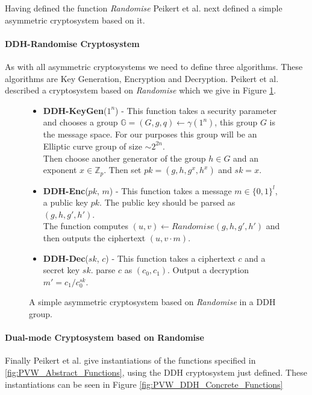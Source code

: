 \documentclass[ %
                    author={Nicholas Tutte},
                supervisor={Prof. Nigel Smart},
                    degree={MEng},
                     title={Secure Two Party Computation},
                  subtitle={A practical comparison of recent protocols},
                      type={Research - GG1K},
                      year={2015} ]{dissertation}
\begin{document}
					Having defined the function \emph{Randomise} Peikert et al. next defined a simple asymmetric cryptosystem based on it.

					\paragraph{DDH-Randomise Cryptosystem} As with all asymmetric cryptosystems we need to define three algorithms. These algorithms are Key Generation, Encryption and Decryption. Peikert et al. described a cryptosystem based on \emph{Randomise} which we give in Figure \ref{fig:DDH_Cryptosystem}.

					\begin{figure}[!htb]
						\begin{mdframed}
							\centering
							\begin{itemize}
								\item \textbf{DDH-KeyGen}($1^n$) - This function takes a security parameter and chooses a group $\mathbb{G} = (G, g, q) \leftarrow \gamma(1^n)$, this group $G$ is the message space. For our purposes this group will be an Elliptic curve group of size $\sim2^{2n}$.\\[0.25cm]

								Then choose another generator of the group $h \in G$ and an exponent $x \in \mathbb{Z}_p$. Then set $pk = (g, h, g^x, h^x)$ and $sk = x$. 

								\item \textbf{DDH-Enc}($pk$, $m$) - This function takes a message $m \in \{0, 1\}^l$, a public key $pk$. The public key should be parsed as $(g, h, g', h')$.\\[0.25cm]

								The function computes $(u, v) \leftarrow Randomise(g, h, g', h')$ and then outputs the ciphertext $(u, v \cdot m)$.

								\item \textbf{DDH-Dec}($sk$, $c$) - This function takes a ciphertext $c$ and a secret key $sk$. parse $c$ as $(c_0, c_1)$. Output a decryption $m' = c_1 / c_0^{sk}$.

							\end{itemize}
						\end{mdframed}

						\caption{A simple asymmetric cryptosystem based on \emph{Randomise} in a DDH group.   \label{fig:DDH_Cryptosystem}}
					\end{figure}


					\paragraph{Dual-mode Cryptosystem based on Randomise} Finally Peikert et al. give instantiations of the functions specified in \ref{fig:PVW_Abstract_Functions}, using the DDH cryptosystem just defined. These instantiations can be seen in Figure \ref{fig:PVW_DDH_Concrete_Functions}\\
\end{document}
